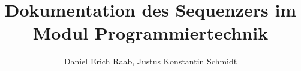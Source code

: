 \documentclass[12pt, a4paper, german]{article}
\title{Dokumentation des Sequenzers im Modul Programmiertechnik}
\author{Daniel Erich Raab, Justus Konstantin Schmidt}
\begin{document}
\def\startlcdtable{
	\begin{figure}[h]
	\ttfamily
	\centering
	\setlength{\tabcolsep}{2pt} %
	\begin{tabular}{|cccccccccccccccc|}
	\hline
}
\def\endlcdtable#1#2{
	\hline
	\end{tabular}
	\normalfont
	\caption{#1}
	\label{#2}
	\end{figure}
}

\newcommand{\lcdtext}[1] {\texttt{\framebox[1.1\width]{#1}}}

\newcommand{\source}[1] {\texttt{#1}}

\newcommand{\xydiagram}[3]{
	\begin{figure}[h]
	\centering
	\[
	\begin{xy}
	\xymatrix {
		#1
	}
	\end{xy}
	\]
	\caption{#2}
	\label{#3}
	\end{figure}
}

\maketitle
\tableofcontents


\end{document}
